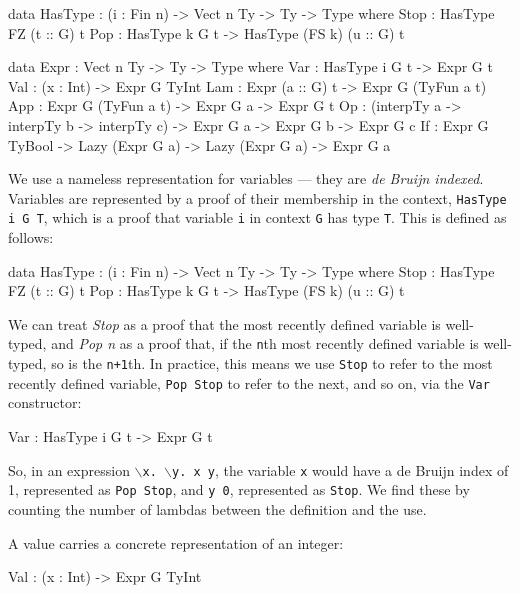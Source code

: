 \begin{code}[caption={Expression representation},label=exprty, float=htp]
data HasType : (i : Fin n) -> Vect n Ty -> Ty -> Type where
    Stop : HasType FZ (t :: G) t
    Pop  : HasType k G t -> HasType (FS k) (u :: G) t

data Expr : Vect n Ty -> Ty -> Type where
    Var : HasType i G t -> Expr G t
    Val : (x : Int) -> Expr G TyInt
    Lam : Expr (a :: G) t -> Expr G (TyFun a t)
    App : Expr G (TyFun a t) -> Expr G a -> Expr G t
    Op  : (interpTy a -> interpTy b -> interpTy c) -> Expr G a ->
          Expr G b -> Expr G c
    If  : Expr G TyBool -> Lazy (Expr G a) -> Lazy (Expr G a) -> Expr G a
\end{code}

\noindent
We use a nameless representation for variables --- they are \emph{de Bruijn indexed}.
Variables are represented by a proof of their membership in the context, \texttt{HasType i G T}, which is a proof that variable \texttt{i} in context  \texttt{G} has type \texttt{T}. This is defined as follows:

\begin{code}
data HasType : (i : Fin n) -> Vect n Ty -> Ty -> Type where
    Stop : HasType FZ (t :: G) t
    Pop  : HasType k G t -> HasType (FS k) (u :: G) t
\end{code}

\noindent
We can treat \emph{Stop} as a proof that the most recently defined variable is well-typed, and \emph{Pop n} as a proof that, if the \texttt{n}th most recently defined variable is well-typed, so is the \texttt{n+1}th.
In practice, this means we use \texttt{Stop} to refer to the most recently defined variable, \texttt{Pop Stop} to refer to the next, and so on, via the \texttt{Var} constructor:

\begin{code}
Var : HasType i G t -> Expr G t
\end{code}

\noindent
So, in an expression \texttt{$\backslash$x. $\backslash$y. x y},  the variable \texttt{x} would have a de Bruijn index of 1, represented as \texttt{Pop Stop}, and \texttt{y 0}, represented as \texttt{Stop}.
We find these by counting the number of lambdas between the definition and the use.

\noindent
A value carries a concrete representation of an integer: 

\begin{code}
Val : (x : Int) -> Expr G TyInt
\end{code}

